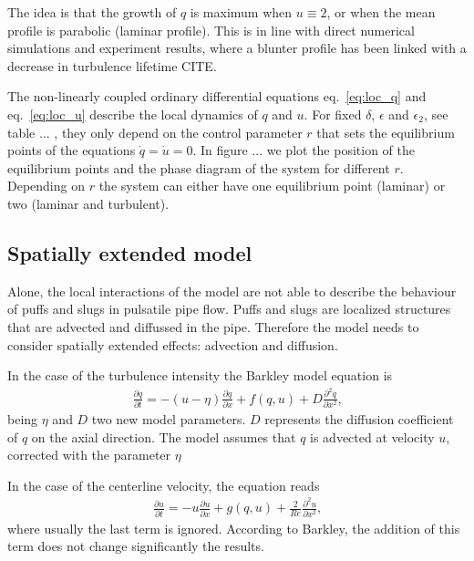 \documentclass{article}
\begin{document}
The idea is that the growth of $q$ is maximum when $u \equiv  2$, or when the mean profile is parabolic (laminar profile). This is in line with direct numerical simulations and experiment results, where a blunter profile has been linked with a decrease in turbulence lifetime CITE.

The non-linearly coupled ordinary differential equations eq.~\ref{eq:loc_q} and eq.~\ref{eq:loc_u} describe the local dynamics of $q$ and $u$. For fixed $\delta$, $\epsilon$ and $\epsilon_{2}$, see table ... , they only depend on the control parameter $r$ that sets the equilibrium points of the equations $\dot{q}=\dot{u}=0$. In figure ... we plot the position of the equilibrium points and the phase diagram of the system for different $r$. Depending on $r$ the system can either have one equilibrium point (laminar) or two (laminar and turbulent).



\subsection{Spatially extended model}
Alone, the local interactions of the model are not able to describe the behaviour of puffs and slugs in pulsatile pipe flow. Puffs and slugs are localized structures that are advected and diffussed in the pipe. Therefore the model needs to consider spatially extended effects: advection and diffusion. 

In the case of the turbulence intensity the Barkley model equation is
\begin{align}
\frac{\partial q}{\partial t}=-\left(u-\eta \right)\frac{\partial q}{\partial x} + f\left(q,u \right) + D\frac{\partial^{2} q}{\partial x^{2}} \text{,}
\label{eq:PDE_q}
\end{align}
being $\eta$ and $D$ two new model parameters. $D$ represents the diffusion coefficient of $q$ on the axial direction. The model assumes that $q$ is advected at velocity $u$, corrected with the parameter $\eta$

In the case of the centerline velocity, the equation reads
\begin{align}
\frac{\partial u}{\partial t}=-u\frac{\partial u}{\partial x} + g\left(q,u \right) + \frac{2}{Re}\frac{\partial^{2} u}{\partial x^{2}} \text{,}
\label{eq:PDE_u}
\end{align}
where usually the last term is ignored. According to Barkley, the addition of this term does not change significantly the results.
\end{document}
